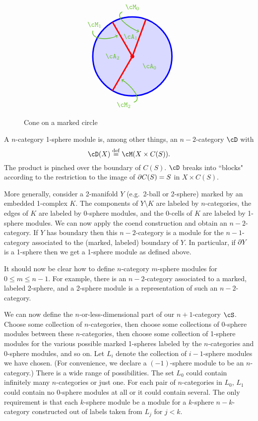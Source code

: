 \begin{figure}[!ht]
$$
\begin{tikzpicture}[baseline,line width = 2pt]
\draw[blue][fill=blue!15!white] (0,0) circle (2);
\fill[red] (0,0) circle (0.1);
\foreach \qm/\qa/\n in {70/-30/0, 120/95/1, -120/180/2} {
	\draw[red] (0,0) -- (\qm:2);
	\path (\qa:1) node {\color{green!50!brown} $\cA_\n$};
	\path (\qm+20:2.5) node(M\n) {\color{green!50!brown} $\cM_\n$};
	\draw[line width=1pt, green!50!brown, ->] (M\n.\qm+135) to[out=\qm+135,in=\qm+90] (\qm+5:1.3);
}
\end{tikzpicture}
$$
\caption{Cone on a marked circle}
\label{feb21d}
\end{figure}

A $n$-category 1-sphere module is, among other things, an $n{-}2$-category $\cD$ with
\[
	\cD(X) \deq \cM(X\times C(S)) .
\]
The product is pinched over the boundary of $C(S)$.
$\cD$ breaks into ``blocks" according to the restriction to the 
image of $\partial C(S) = S$ in $X\times C(S)$.

More generally, consider a 2-manifold $Y$ 
(e.g.\ 2-ball or 2-sphere) marked by an embedded 1-complex $K$.
The components of $Y\setminus K$ are labeled by $n$-categories, 
the edges of $K$ are labeled by 0-sphere modules, 
and the 0-cells of $K$ are labeled by 1-sphere modules.
We can now apply the coend construction and obtain an $n{-}2$-category.
If $Y$ has boundary then this $n{-}2$-category is a module for the $n{-}1$-category
associated to the (marked, labeled) boundary of $Y$.
In particular, if $\partial Y$ is a 1-sphere then we get a 1-sphere module as defined above.

\medskip

It should now be clear how to define $n$-category $m$-sphere modules for $0\le m \le n-1$.
For example, there is an $n{-}2$-category associated to a marked, labeled 2-sphere,
and a 2-sphere module is a representation of such an $n{-}2$-category.

\medskip

We can now define the $n$-or-less-dimensional part of our $n{+}1$-category $\cS$.
Choose some collection of $n$-categories, then choose some collections of 0-sphere modules between
these $n$-categories, then choose some collection of 1-sphere modules for the various
possible marked 1-spheres labeled by the $n$-categories and 0-sphere modules, and so on.
Let $L_i$ denote the collection of $i{-}1$-sphere modules we have chosen.
(For convenience, we declare a $(-1)$-sphere module to be an $n$-category.)
There is a wide range of possibilities.
The set $L_0$ could contain infinitely many $n$-categories or just one.
For each pair of $n$-categories in $L_0$, $L_1$ could contain no 0-sphere modules at all or 
it could contain several.
The only requirement is that each $k$-sphere module be a module for a $k$-sphere $n{-}k$-category
constructed out of labels taken from $L_j$ for $j<k$.

